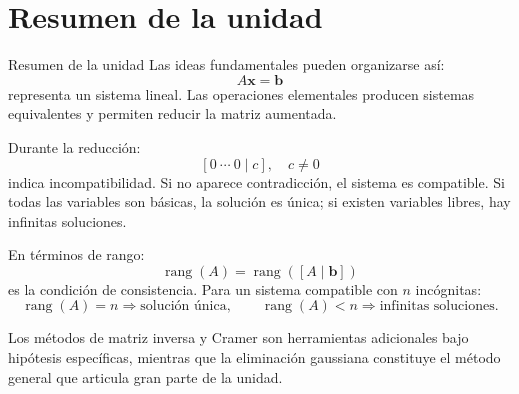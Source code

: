 \documentclass[aspectratio=169,9pt]{beamer}
\theoremstyle{remark}
\newcommand{\rank}{\operatorname{rang}}
\begin{document}
\section{Resumen de la unidad}
\begin{frame}[allowframebreaks,t]{Resumen de la unidad}
Las ideas fundamentales pueden organizarse así:
\[
A\mathbf x=\mathbf b
\]
representa un sistema lineal. Las operaciones elementales producen sistemas equivalentes y permiten
reducir la matriz aumentada.

Durante la reducción:
\[
[0\ \cdots\ 0\mid c],\quad c\neq0
\]
indica incompatibilidad. Si no aparece contradicción, el sistema es compatible. Si todas las variables
son básicas, la solución es única; si existen variables libres, hay infinitas soluciones.

En términos de rango:
\[
\boxed{\rank(A)=\rank([A\mid\mathbf b])}
\]
es la condición de consistencia. Para un sistema compatible con $n$ incógnitas:
\[
\rank(A)=n\Longrightarrow\text{solución única},
\qquad
\rank(A)<n\Longrightarrow\text{infinitas soluciones}.
\]

Los métodos de matriz inversa y Cramer son herramientas adicionales bajo hipótesis específicas, mientras
que la eliminación gaussiana constituye el método general que articula gran parte de la unidad.
\end{frame}
\end{document}
